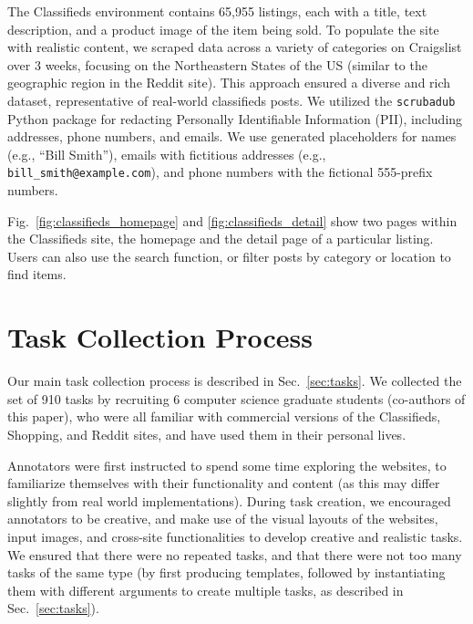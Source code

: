 The Classifieds environment contains 65,955 listings, each with a title, text description, and a product image of the item being sold. To populate the site with realistic content, we scraped data across a variety of categories on Craigslist over 3 weeks, focusing on the Northeastern States of the US (similar to the geographic region in the Reddit site). This approach ensured a diverse and rich dataset, representative of real-world classifieds posts. 
We utilized the \texttt{scrubadub} Python package for redacting Personally Identifiable Information (PII), including addresses, phone numbers, and emails. We use generated placeholders for names (e.g., ``Bill Smith''), emails with fictitious addresses (e.g., \texttt{bill\_smith@example.com}), and phone numbers with the fictional 555-prefix numbers.

Fig.~\ref{fig:classifieds_homepage} and \ref{fig:classifieds_detail} show two pages within the Classifieds site, the homepage and the detail page of a particular listing. Users can also use the search function, or filter posts by category or location to find items.

\section{Task Collection Process}  \label{sec:appendix_annotation}
Our main task collection process is described in Sec.~\ref{sec:tasks}. We collected the set of 910 tasks by recruiting 6 computer science graduate students (co-authors of this paper), who were all familiar with commercial versions of the Classifieds, Shopping, and Reddit sites, and have used them in their personal lives.

Annotators were first instructed to spend some time exploring the \BenchmarkName{} websites, to familiarize themselves with their functionality and content (as this may differ slightly from real world implementations). During task creation, we encouraged annotators to be creative, and make use of the visual layouts of the websites, input images, and cross-site functionalities to develop creative and realistic tasks. We ensured that there were no repeated tasks, and that there were not too many tasks of the same type (by first producing templates, followed by instantiating them with different arguments to create multiple tasks, as described in Sec.~\ref{sec:tasks}).

